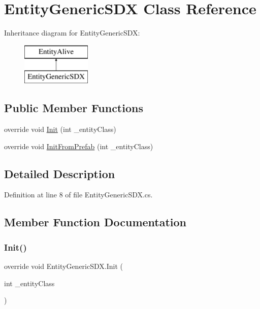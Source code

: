 \hypertarget{class_entity_generic_s_d_x}{}\section{Entity\+Generic\+S\+DX Class Reference}
\label{class_entity_generic_s_d_x}
Inheritance diagram for Entity\+Generic\+S\+DX\+:\begin{figure}[H]
\begin{center}
\leavevmode
\includegraphics[height=2.000000cm]{de/dd4/class_entity_generic_s_d_x}
\end{center}
\end{figure}
\subsection*{Public Member Functions}
\begin{DoxyCompactItemize}
\item 
override void \mbox{\hyperlink{class_entity_generic_s_d_x_aeb473bfc33f2d11fa6ff2774be24d6bb}{Init}} (int \+\_\+entity\+Class)
\item 
override void \mbox{\hyperlink{class_entity_generic_s_d_x_ae8b8dcd1b303f606cc1c997b47583d9a}{Init\+From\+Prefab}} (int \+\_\+entity\+Class)
\end{DoxyCompactItemize}


\subsection{Detailed Description}


Definition at line 8 of file Entity\+Generic\+S\+D\+X.\+cs.



\subsection{Member Function Documentation}
\mbox{\label{class_entity_generic_s_d_x_aeb473bfc33f2d11fa6ff2774be24d6bb}} 
\subsubsection{\texorpdfstring{Init()}{Init()}}
{\footnotesize\ttfamily override void Entity\+Generic\+S\+D\+X.\+Init (\begin{DoxyParamCaption}\item[{int}]{\+\_\+entity\+Class }\end{DoxyParamCaption})}



